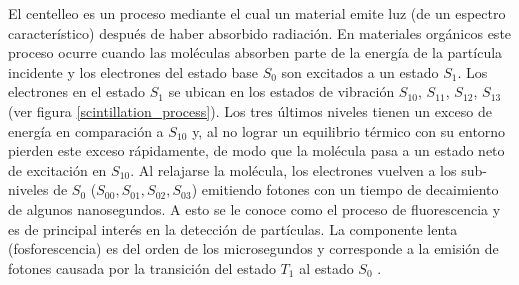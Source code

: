 \documentclass[12pt,oneside,openany,letter]{book}
\begin{document}
El centelleo es un proceso mediante el cual un material emite luz (de un espectro característico) después de haber absorbido radiación. En materiales orgánicos este proceso ocurre cuando las moléculas absorben parte de la energía de la partícula incidente y los electrones del estado base $S_0$ son excitados a un estado $S_1$. Los electrones en el estado $S_1$ se ubican en los estados de vibración $S_{10}$, $S_{11}$, $S_{12}$, $S_{13}$ (ver figura \ref{scintillation_process}). Los tres últimos niveles tienen un exceso de energía en comparación a $S_{10}$ y, al no lograr un equilibrio térmico con su entorno pierden este exceso rápidamente, de modo que la molécula pasa a un estado neto de excitación en $S_{10}$. Al relajarse la molécula, los electrones vuelven a los sub-niveles de $S_0$ ($S_{00}, S_{01}, S_{02}, S_{03}$) emitiendo fotones con un tiempo de decaimiento de algunos nanosegundos. A esto se le conoce como el proceso de fluorescencia y es de principal interés en la detección de partículas. La componente lenta (fosforescencia) es del orden de los microsegundos y corresponde a la emisión de fotones causada por la transición del estado $T_{1}$ al estado $S_0$ \cite{SuarezDuran2016}.
\end{document}
